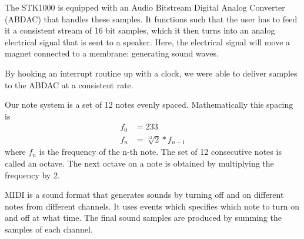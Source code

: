 \documentclass[a4paper,12pt]{article}
\begin{document}
The STK1000 is equipped with an Audio Bitstream Digital Analog Converter
(ABDAC) that handles these samples. It functions such that the user has to feed it a consistent stream of 16 bit samples, which it then turns into an analog electrical signal that is sent to a speaker. Here, the electrical signal will move a magnet connected to a membrane: generating sound waves.

By hooking an interrupt routine up with a clock, we were able to deliver samples to the ABDAC at a consistent rate.

Our note system is a set of 12 notes evenly spaced. Mathematically this spacing is 
\begin{align*}
f_0&=233\\
f_n&=\sqrt[12]{2} * f_{n-1}
\end{align*} 
where $f_n$ is the frequency of the n-th note. The set of 12 consecutive notes is called an octave. The next octave on a note is obtained by multiplying the frequency by 2. 

MIDI is a sound format that generates sounds by turning off and on different notes from different channels. It uses events which specifies which note to turn on and off at what time. The final sound samples are produced by summing the samples of each channel. 
\end{document}
